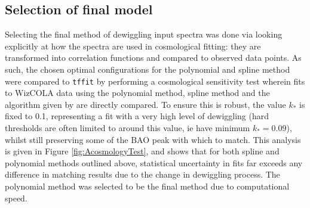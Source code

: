 \documentclass[a4paper,fleqn,usenatbib]{mnras}
\begin{document}
	
	\subsection{Selection of final model}
	
	Selecting the final method of dewiggling input spectra was done via looking explicitly at how the spectra are used in cosmological fitting: they are transformed into correlation functions and compared to observed data points. As such, the chosen optimal configurations for the polynomial and spline method were compared to \verb;tffit; by performing a cosmological sensitivity test wherein fits to WizCOLA data using the polynomial method, spline method and the algorithm given by \citet{EisensteinHu1998} are directly compared. To ensure this is robust, the value $k_*$ is fixed to 0.1, representing a fit with a very high level of dewiggling (hard thresholds are often limited to around this value, ie \citet{ChuangWang2012} have minimum $k_* = 0.09$), whilst still preserving some of the BAO peak with which to match. This analysis is given in Figure \ref{fig:AcosmologyTest}, and shows that for both spline and polynomial methods outlined above, statistical uncertainty in fits far exceeds any difference in matching results due to the change in dewiggling process. The polynomial method was selected to be the final method due to computational speed.
	
\end{document}

